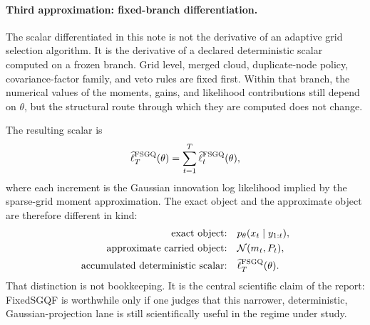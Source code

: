 \documentclass[11pt]{article}
\numberwithin{equation}{section}
\newcommand{\N}{\mathcal N}
\newcommand{\ellhat}{\widehat\ell}
\begin{document}
\paragraph{Third approximation: fixed-branch differentiation.}
The scalar differentiated in this note is not the derivative of an adaptive grid
selection algorithm.  It is the derivative of a declared deterministic scalar
computed on a frozen branch.  Grid level, merged cloud, duplicate-node policy,
covariance-factor family, and veto rules are fixed first.  Within that branch,
the numerical values of the moments, gains, and likelihood contributions still
depend on \(\theta\), but the structural route through which they are computed
does not change.

The resulting scalar is
\begin{equation}
  \ellhat_T^{\rm FSGQ}(\theta)
  =
  \sum_{t=1}^T \ellhat_t^{\rm FSGQ}(\theta),
  \label{eq:p32-one-page-scalar}
\end{equation}
where each increment is the Gaussian innovation log likelihood implied by the
sparse-grid moment approximation.  The exact object and the approximate object
are therefore different in kind:
\begin{equation}
\begin{aligned}
  \text{exact object:}
  &\quad p_\theta(x_t\mid y_{1:t}), \\
  \text{approximate carried object:}
  &\quad \N(m_t,P_t), \\
  \text{accumulated deterministic scalar:}
  &\quad \ellhat_T^{\rm FSGQ}(\theta).
\end{aligned}
  \label{eq:p32-exact-vs-approximate-summary}
\end{equation}
That distinction is not bookkeeping.  It is the central scientific claim of the
report: FixedSGQF is worthwhile only if one judges that this narrower,
deterministic, Gaussian-projection lane is still scientifically useful in the
regime under study.
\end{document}
